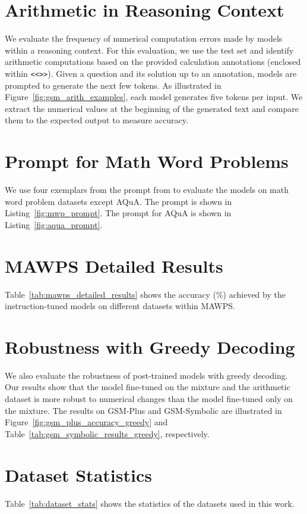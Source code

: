\appendix
\clearpage

\section{Arithmetic in Reasoning Context}
\label{app:gsm8k_arith_details}
We evaluate the frequency of numerical computation errors made by models within a reasoning context. For this evaluation, we use the \gsm{} test set and identify arithmetic computations based on the provided calculation annotations (enclosed within \texttt{<<>>}). Given a question and its solution up to an annotation, models are prompted to generate the next few tokens. As illustrated in Figure~\ref{fig:gsm_arith_examples}, each model generates five tokens per input. We extract the numerical values at the beginning of the generated text and compare them to the expected output to measure accuracy.

\section{Prompt for Math Word Problems}
\label{app:math_prompt}
We use four exemplars from the prompt from \citet{wei2022chain} to evaluate the models on math word problem datasets except AQuA. The prompt is shown in Listing~\ref{fig:mwp_prompt}. The prompt for AQuA is shown in Listing~\ref{fig:aqua_prompt}.

\section{MAWPS Detailed Results}
\label{app:mawps_detailed_results}
Table~\ref{tab:mawps_detailed_results} shows the accuracy (\%) achieved by the instruction-tuned models on different datasets within MAWPS.

\section{Robustness with Greedy Decoding}
\label{app:robustness_greedy}
We also evaluate the robustness of post-trained models with greedy decoding. Our results show that the model fine-tuned on the \tulu{} mixture and the arithmetic dataset is more robust to numerical changes than the model fine-tuned only on the \tulu{} mixture. The results on GSM-Plus and GSM-Symbolic are illustrated in Figure~\ref{fig:gsm_plus_accuracy_greedy} and Table~\ref{tab:gsm_symbolic_results_greedy}, respectively.




\section{Dataset Statistics}
Table~\ref{tab:dataset_stats} shows the statistics of the datasets used in this work.





